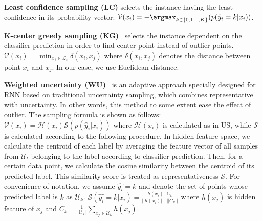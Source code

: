 \noindent
\textbf{Least confidence sampling (LC)} selects the instance having the least confidence in its probability vector:
$\mathcal{V}(x_i) = - \argmax_{k \in \{0,1,..,K\}}(p(\hat{y}_i=k|x_i))$.
    
\noindent
\textbf{K-center greedy sampling (KG)}~\cite{sener2017geometric} selects the instance dependent on the classifier prediction in order to find center point instead of outlier points.
    $\mathcal{V}(x_i) = \min_{x_j \in \mathcal{L}_t}\delta(x_i,x_j)$
where $\delta(x_i,x_j)$ denotes the distance between point $x_i$ and $x_j$. In our case, we use Euclidean distance.
    
\noindent
\textbf{Weighted uncertainty (WU)}~\cite{zhao2017deep} is an adaptive approach specially designed for RNN based on traditional uncertainty sampling, which combines representative with uncertainty. In other words, this method to some extent ease the effect of outlier. The sampling formula is shown as follows:
    $\mathcal{V}(x_i) = \mathcal{H}(x_i) \mathcal{S}(p(\hat{y}_i|x_i))$
    where $\mathcal{H}(x_i)$ is calculated as in US, while $\mathcal{S}$ is calculated according to the following procedure. 
    In hidden feature space, we calculate the centroid of each label by averaging the feature vector of all samples from $\mathcal{U}_t$ belonging to the label according to classifier prediction. Then, for a certain data point, we calculate the cosine similarity between the centroid of its predicted label. This similarity score is treated as representativeness $\mathcal{S}$.  For convenience of notation, we assume $\hat{y_i} = k$ and denote the set of points whose predicted label is $k$ as $\mathcal{U}_k$. 
    $\mathcal{S}(\hat{y_i} = k|x_i) = \frac{h(x_i) \cdot C_k}{||h(x_i)|| \cdot ||C_k||}$ where $h(x_j)$ is hidden feature of $x_j$ and 
    $C_k = \frac{1}{|\mathcal{U}_k|} \sum_{x_j \in \mathcal{U}_k} h(x_j)$.



